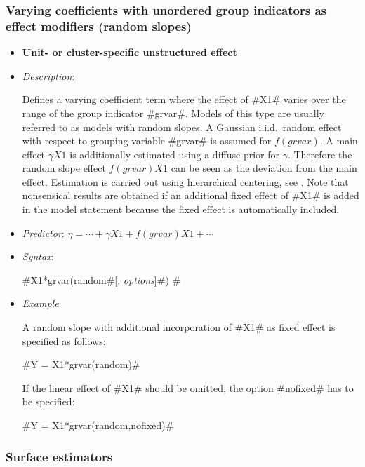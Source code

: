 

\subsubsection*{Varying coefficients with unordered group indicators as effect modifiers
(random slopes)}

\begin{itemize}
\item[]{\bf\sffamily Unit- or cluster-specific unstructured
effect}

\item[] {\em Description}:

Defines a varying coefficient term where the effect of #X1# varies
over the range of the group indicator #grvar#. Models of this type
are usually referred to as models with random slopes. A Gaussian
i.i.d.~random effect with respect to grouping variable #grvar# is
assumed for $f(grvar)$. A main effect $\gamma X1$ is additionally
estimated using a diffuse prior for $\gamma$. Therefore the random
slope effect $f(grvar)X1$ can be seen as the deviation from the
main effect. Estimation is carried out using hierarchical
centering, see . Note that
nonsensical results are obtained if an additional fixed effect of
#X1# is added in the model statement because the fixed effect is
automatically included. \item[] {\em Predictor}: $\eta = \cdots +
\gamma X1 + f(grvar)X1 + \cdots$ \item[] {\em Syntax}:

#X1*grvar(random#[, {\em options}]#) #
\item[] {\em Example}:

A random slope with additional incorporation of #X1# as fixed
effect is specified as follows:

#Y = X1*grvar(random)#

If the linear effect of #X1# should be omitted, the option
#nofixed# has to be specified:

#Y = X1*grvar(random,nofixed)#
\end{itemize}


\subsubsection*{Surface estimators}

